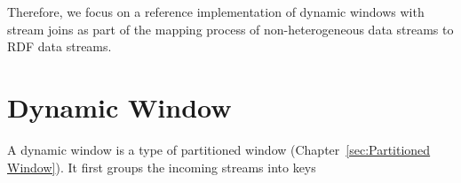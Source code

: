 Therefore, we focus on a reference implementation of dynamic windows with 
stream joins as part of the mapping process of non-heterogeneous data streams 
to RDF data streams. 
\section{Dynamic Window}%
\label{sec:Dynamic Window}

A dynamic window is a type of partitioned window (Chapter~\ref{sec:Partitioned Window}).
It first groups the incoming streams into keys 




